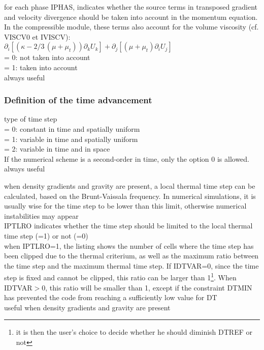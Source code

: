 {for each phase IPHAS, indicates whether the source terms in transposed gradient
and velocity divergence should be taken into account in the momentum
equation. In the compressible module, these terms also account for the volume
viscosity (cf. VISCV0 et IVISCV):\\
$\partial_i \left[(\kappa -2/3\,(\mu+\mu_t))\partial_k U_k  \right]  
 +     \partial_j \left[ (\mu+\mu_t)\partial_i U_j \right]$ \\
\hspace*{1.3cm}= 0: not taken into account\\
\hspace*{1.3cm}= 1: taken into account\\
always useful}


\subsubsection{Definition of the time advancement}

{type of time step\\
\hspace*{1.3cm}= 0: constant in time and spatially uniform\\ 
\hspace*{1.3cm}= 1: variable in time and spatially uniform\\
\hspace*{1.3cm}= 2: variable in time and in space\\
If the numerical scheme is a second-order in time, only the option 0 is
allowed.\\ 
always useful}

{when density gradients and gravity are present, a local thermal time
step can be calculated, based on the Brunt-Vaissala frequency. In numerical
simulations, it is usually wise for the time step to be lower than this limit,
otherwise numerical instabilities may appear\\
IPTLRO indicates whether the time step should be limited to the local thermal
time step (=1) or not (=0)\\
when IPTLRO=1, the listing shows the number of cells where the time step has
been clipped due to the thermal criterium, as well as the maximum ratio between
the time step and the maximum thermal time step. If IDTVAR=0, since the time
step is fixed and cannot be clipped, this ratio can be larger than
1\footnote{it is then the user's 
choice to decide whether he should diminish DTREF or not}. When IDTVAR$>$0, this
ratio will be smaller than 1, except if the constraint DTMIN has prevented the
code from reaching a sufficiently low value for DT\\
useful when density gradients and gravity are present}

